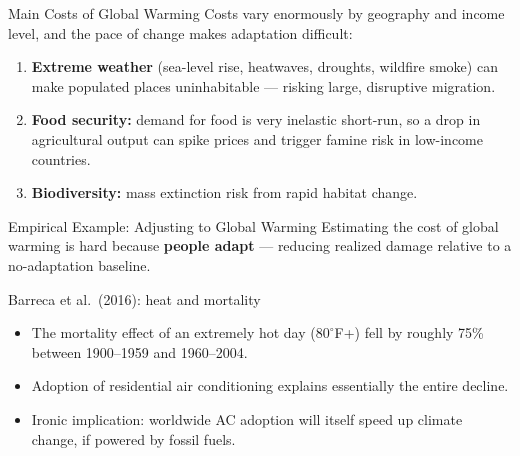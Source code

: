 \documentclass[11pt,aspectratio=169]{beamer}
\begin{document}
\begin{frame}{Main Costs of Global Warming}
  Costs vary enormously by geography and income level, and the pace of change makes adaptation difficult:
  \begin{enumerate}
    \item \textbf{Extreme weather} (sea-level rise, heatwaves, droughts, wildfire smoke) can make populated places uninhabitable --- risking large, disruptive migration.
    \item \textbf{Food security:} demand for food is very inelastic short-run, so a drop in agricultural output can spike prices and trigger famine risk in low-income countries.
    \item \textbf{Biodiversity:} mass extinction risk from rapid habitat change.
  \end{enumerate}
\end{frame}



\begin{frame}{Empirical Example: Adjusting to Global Warming}
  Estimating the cost of global warming is hard because \textbf{people adapt} --- reducing realized damage relative to a no-adaptation baseline.
  \begin{block}{Barreca et al.\ (2016): heat and mortality}
    \begin{itemize}
      \item The mortality effect of an extremely hot day ($80^\circ$F+) fell by roughly 75\% between 1900--1959 and 1960--2004.
      \item Adoption of residential air conditioning explains essentially the entire decline.
      \item Ironic implication: worldwide AC adoption will itself speed up climate change, if powered by fossil fuels.
    \end{itemize}
  \end{block}
\end{frame}
\end{document}

